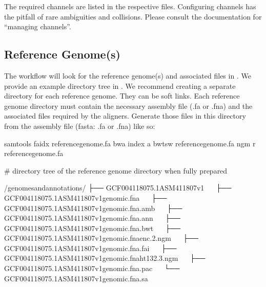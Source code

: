 \documentclass[letterpaper,10pt,english]{sphinxhowto}
\begin{document}
The required channels are listed in the respective  files. Configuring channels has the pitfall of rare ambiguities and collisions. Please consult the  documentation for “managing channels”.


\subsection{Reference Genome(s)}
\label{\detokenize{index:reference-genome-s}}
The workflow will look for the reference genome(s) and associated files in . We provide an example directory tree in . We recommend creating a separate directory for each reference genome. They can be soft links. Each reference genome directory must contain the necessary assembly file (.fa or .fna) and the associated files required by the aligners. Generate those files in this directory from the assembly file (fasta: .fa or .fna) like so:

\begin{sphinxVerbatim}[commandchars=\\\{\}]
\PYGZdl{} samtools faidx \PYGZlt{}reference\PYGZhy{}genome.fa\PYGZgt{}
\PYGZdl{} bwa index \PYGZhy{}a bwtsw \PYGZlt{}reference\PYGZhy{}genome.fa\PYGZgt{}
\PYGZdl{} ngm \PYGZhy{}r \PYGZlt{}reference\PYGZhy{}genome.fa\PYGZgt{}
\end{sphinxVerbatim}

\# directory tree of the reference genome directory when fully prepared

\begin{sphinxVerbatim}[commandchars=\\\{\}]
\PYGZti{}/genomes\PYGZus{}and\PYGZus{}annotations/
├── GCF\PYGZus{}004118075.1\PYGZus{}ASM411807v1
   ├── GCF\PYGZus{}004118075.1\PYGZus{}ASM411807v1\PYGZus{}genomic.fna
   ├── GCF\PYGZus{}004118075.1\PYGZus{}ASM411807v1\PYGZus{}genomic.fna.amb
   ├── GCF\PYGZus{}004118075.1\PYGZus{}ASM411807v1\PYGZus{}genomic.fna.ann
   ├── GCF\PYGZus{}004118075.1\PYGZus{}ASM411807v1\PYGZus{}genomic.fna.bwt
   ├── GCF\PYGZus{}004118075.1\PYGZus{}ASM411807v1\PYGZus{}genomic.fna\PYGZhy{}enc.2.ngm
   ├── GCF\PYGZus{}004118075.1\PYGZus{}ASM411807v1\PYGZus{}genomic.fna.fai
   ├── GCF\PYGZus{}004118075.1\PYGZus{}ASM411807v1\PYGZus{}genomic.fna\PYGZhy{}ht\PYGZhy{}13\PYGZhy{}2.3.ngm
   ├── GCF\PYGZus{}004118075.1\PYGZus{}ASM411807v1\PYGZus{}genomic.fna.pac
   └── GCF\PYGZus{}004118075.1\PYGZus{}ASM411807v1\PYGZus{}genomic.fna.sa
\end{sphinxVerbatim}
\end{document}
